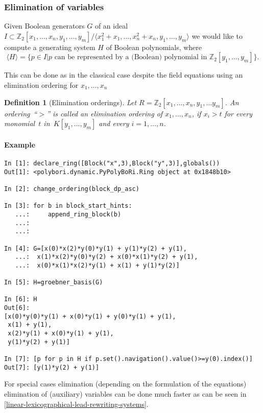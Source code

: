 \documentclass[]{article}
\newcommand{\set}[1]{\{#1\}}
\newcommand{\Ztwo}{\mathbb{Z}_2}
\newcounter{thm}
\newtheorem{definition}[thm]{Definition}
\begin{document}
\subsubsection{Elimination of variables}

Given Boolean generators $G$ of an ideal $I\subset \Ztwo[x_1,\ldots,x_n,y_1,\ldots,y_m]/\langle x_1^2+x_1,\ldots,x_n^2+x_n,y_1,\ldots,y_m \rangle$
we would like to compute a generating system $H$ of Boolean polynomials, where $$\langle H\rangle=\set{p\in I\vert p \mbox{ can be represented by a (Boolean) polynomial in } \Ztwo[y_1,\ldots,y_m]}.$$

This can be done as in the classical case despite the field equations using an elimination ordering for $x_1, \ldots, x_n$

\begin{definition}[Elimination orderings]
  Let $R=\Ztwo[x_1,\ldots, x_n, y_1, \ldots y_m]$. An ordering~``$>$'' is called an \emph{elimination ordering} of $x_1, \ldots, x_n$, if $x_i>t$ 
  for every monomial~$t$ in~$K[y_1, \ldots, y_m]$ and every $i=1,\ldots,n$. 
\end{definition}
\paragraph{Example} %
\label{par:example-elimination}
\begin{lstlisting}
In [1]: declare_ring([Block("x",3),Block("y",3)],globals())
Out[1]: <polybori.dynamic.PyPolyBoRi.Ring object at 0x1848b10>

In [2]: change_ordering(block_dp_asc)

In [3]: for b in block_start_hints:
   ...:     append_ring_block(b)
   ...:     
   ...:     

In [4]: G=[x(0)*x(2)*y(0)*y(1) + y(1)*y(2) + y(1),
   ...:  x(1)*x(2)*y(0)*y(2) + x(0)*x(1)*y(2) + y(1),
   ...:  x(0)*x(1)*x(2)*y(1) + x(1) + y(1)*y(2)]

In [5]: H=groebner_basis(G)

In [6]: H
Out[6]: 
[x(0)*y(0)*y(1) + x(0)*y(1) + y(0)*y(1) + y(1),
 x(1) + y(1),
 x(2)*y(1) + x(0)*y(1) + y(1),
 y(1)*y(2) + y(1)]

In [7]: [p for p in H if p.set().navigation().value()>=y(0).index()]
Out[7]: [y(1)*y(2) + y(1)]
\end{lstlisting}

For special cases elimination (depending on the formulation of the equations) elimination of (auxiliary) variables can be done much faster as can be seen in \ref{linear-lexicographical-lead-rewriting-systems}.
\end{document}
